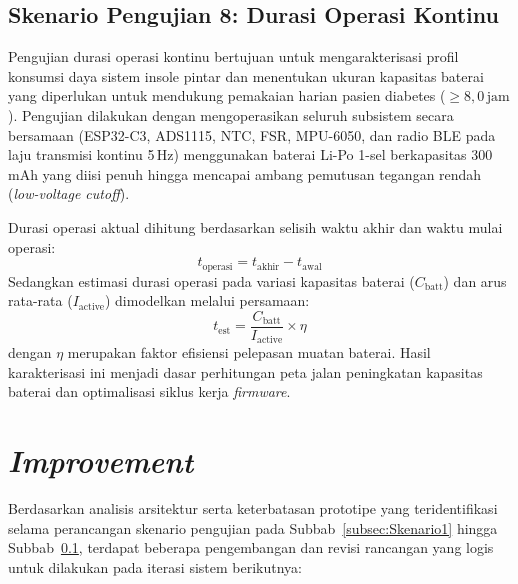 \subsection{Skenario Pengujian 8: Durasi Operasi Kontinu}
\label{subsec:Skenario8}

Pengujian durasi operasi kontinu bertujuan untuk mengarakterisasi profil konsumsi daya sistem insole pintar dan menentukan ukuran kapasitas baterai yang diperlukan untuk mendukung pemakaian harian pasien diabetes ($\ge 8{,}0\,\mathrm{jam}$). Pengujian dilakukan dengan mengoperasikan seluruh subsistem secara bersamaan (ESP32-C3, ADS1115, NTC, FSR, MPU-6050, dan radio BLE pada laju transmisi kontinu 5\,Hz) menggunakan baterai Li-Po 1-sel berkapasitas 300\,mAh yang diisi penuh hingga mencapai ambang pemutusan tegangan rendah (\textit{low-voltage cutoff}).

Durasi operasi aktual dihitung berdasarkan selisih waktu akhir dan waktu mulai operasi:
\begin{equation}
t_{\mathrm{operasi}} = t_{\mathrm{akhir}} - t_{\mathrm{awal}}
\end{equation}
Sedangkan estimasi durasi operasi pada variasi kapasitas baterai ($C_{\mathrm{batt}}$) dan arus rata-rata ($I_{\mathrm{active}}$) dimodelkan melalui persamaan:
\begin{equation}
t_{\mathrm{est}} = \frac{C_{\mathrm{batt}}}{I_{\mathrm{active}}} \times \eta
\end{equation}
dengan $\eta$ merupakan faktor efisiensi pelepasan muatan baterai. Hasil karakterisasi ini menjadi dasar perhitungan peta jalan peningkatan kapasitas baterai dan optimalisasi siklus kerja \textit{firmware}.

\section{\textit{Improvement}}
\label{sec:improvement}

Berdasarkan analisis arsitektur serta keterbatasan prototipe yang teridentifikasi selama perancangan skenario pengujian pada Subbab~\ref{subsec:Skenario1} hingga Subbab~\ref{subsec:Skenario8}, terdapat beberapa pengembangan dan revisi rancangan yang logis untuk dilakukan pada iterasi sistem berikutnya:

